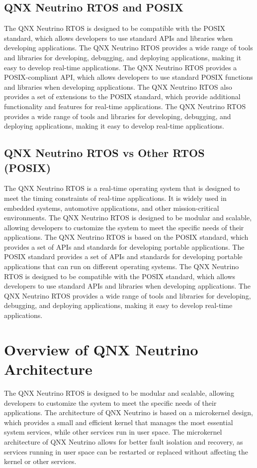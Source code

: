 \documentclass{article}
\begin{document}
\subsection{QNX Neutrino RTOS and POSIX}
\label{sec:qnx-neutrino-posix}
The QNX Neutrino RTOS is designed to be compatible with the POSIX standard, which allows developers to use standard APIs and libraries when developing applications.
The QNX Neutrino RTOS provides a wide range of tools and libraries for developing, debugging, and deploying applications, making it easy to develop real-time applications.
The QNX Neutrino RTOS provides a POSIX-compliant API, which allows developers to use standard POSIX functions and libraries when developing applications.
The QNX Neutrino RTOS also provides a set of extensions to the POSIX standard, which provide additional functionality and features for real-time applications.
The QNX Neutrino RTOS provides a wide range of tools and libraries for developing, debugging, and deploying applications, making it easy to develop real-time applications.

\subsection{QNX Neutrino RTOS vs Other RTOS (POSIX)}
\label{sec:qnx-neutrino-vs-other-rtos}
The QNX Neutrino RTOS is a real-time operating system that is designed to meet the timing constraints of real-time applications.
It is widely used in embedded systems, automotive applications, and other mission-critical environments.
The QNX Neutrino RTOS is designed to be modular and scalable, allowing developers to customize the system to meet the specific needs of their applications.
The QNX Neutrino RTOS is based on the POSIX standard, which provides a set of APIs and standards for developing portable applications.
The POSIX standard provides a set of APIs and standards for developing portable applications that can run on different operating systems.
The QNX Neutrino RTOS is designed to be compatible with the POSIX standard, which allows developers to use standard APIs and libraries when developing applications.
The QNX Neutrino RTOS provides a wide range of tools and libraries for developing, debugging, and deploying applications, making it easy to develop real-time applications.

\section{Overview of QNX Neutrino Architecture}
\label{sec:qnx-neutrino-architecture}
The QNX Neutrino RTOS is designed to be modular and scalable, allowing developers to customize the system to meet the specific needs of their applications.
The architecture of QNX Neutrino is based on a microkernel design, which provides a small and efficient kernel that manages the most essential system services, while other services run in user space.
The microkernel architecture of QNX Neutrino allows for better fault isolation and recovery, as services running in user space can be restarted or replaced without affecting the kernel or other services.
\end{document}
